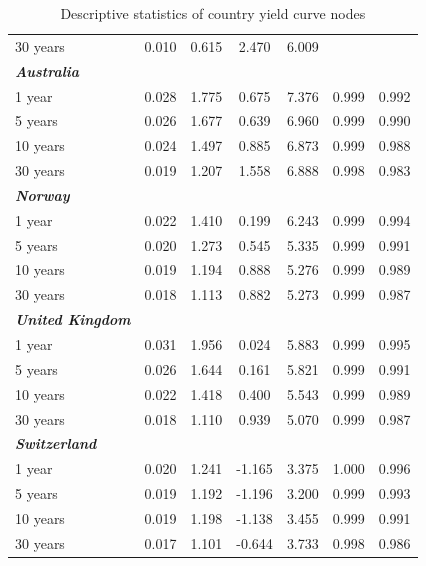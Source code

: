 \documentclass[12pt,bibliography=totoc]{article}
\begin{document}
\begin{appendices}
\begin{table}[H]
\begin{tabular}{l c c c c c c}
30 years	&	0.010	&	0.615	&	2.470	&	6.009	&		&		\\
\textbf{\textit{Australia}}	&		&		&		&		&		&		\\
1 year	&	0.028	&	1.775	&	0.675	&	7.376	&	0.999	&	0.992	\\
5 years	&	0.026	&	1.677	&	0.639	&	6.960	&	0.999	&	0.990	\\
10 years	&	0.024	&	1.497	&	0.885	&	6.873	&	0.999	&	0.988	\\
												
30 years	&	0.019	&	1.207	&	1.558	&	6.888	&	0.998	&	0.983	\\
\textbf{\textit{Norway}}	&		&		&		&		&		&		\\
1 year	&	0.022	&	1.410	&	0.199	&	6.243	&	0.999	&	0.994	\\
5 years	&	0.020	&	1.273	&	0.545	&	5.335	&	0.999	&	0.991	\\
10 years	&	0.019	&	1.194	&	0.888	&	5.276	&	0.999	&	0.989	\\
												
30 years	&	0.018	&	1.113	&	0.882	&	5.273	&	0.999	&	0.987	\\
\textbf{\textit{United Kingdom}}	&		&		&		&		&		&		\\
1 year	&	0.031	&	1.956	&	0.024	&	5.883	&	0.999	&	0.995	\\
5 years	&	0.026	&	1.644	&	0.161	&	5.821	&	0.999	&	0.991	\\
10 years	&	0.022	&	1.418	&	0.400	&	5.543	&	0.999	&	0.989	\\
												
30 years	&	0.018	&	1.110	&	0.939	&	5.070	&	0.999	&	0.987	\\
\textbf{\textit{Switzerland}}	&		&		&		&		&		&		\\
1 year	&	0.020	&	1.241	&	-1.165	&	3.375	&	1.000	&	0.996	\\
5 years	&	0.019	&	1.192	&	-1.196	&	3.200	&	0.999	&	0.993	\\
10 years	&	0.019	&	1.198	&	-1.138	&	3.455	&	0.999	&	0.991	\\
30 years	&	0.017	&	1.101	&	-0.644	&	3.733	&	0.998	&	0.986	\\

\hline%
\end{tabular}
\label{table:nonlin}%
\caption{Descriptive statistics of country yield curve nodes}%
\end{table}


\end{appendices}
\end{document}
